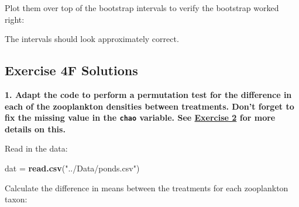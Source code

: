 \documentclass[]{book}
\newenvironment{Shaded}{\begin{snugshade}}{\end{snugshade}}
\newcommand{\DataTypeTok}[1]{\textcolor[rgb]{0.13,0.29,0.53}{#1}}
\newcommand{\KeywordTok}[1]{\textcolor[rgb]{0.13,0.29,0.53}{\textbf{#1}}}
\newcommand{\NormalTok}[1]{#1}
\newcommand{\OperatorTok}[1]{\textcolor[rgb]{0.81,0.36,0.00}{\textbf{#1}}}
\newcommand{\StringTok}[1]{\textcolor[rgb]{0.31,0.60,0.02}{#1}}
\begin{document}
Plot them over top of the bootstrap intervals to verify the bootstrap worked right:

The intervals should look approximately correct.

\hypertarget{ex4f-answers}{%
\subsection*{Exercise 4F Solutions}\label{ex4f-answers}}

\textbf{1. Adapt the code to perform a permutation test for the difference in each of the zooplankton densities between treatments. Don't forget to fix the missing value in the \texttt{chao} variable. See \protect\hyperlink{ex1b}{Exercise 2} for more details on this.}

Read in the data:

\begin{Shaded}
\begin{Highlighting}[]
\NormalTok{dat =}\StringTok{ }\KeywordTok{read.csv}\NormalTok{(}\StringTok{"../Data/ponds.csv"}\NormalTok{)}
\end{Highlighting}
\end{Shaded}

Calculate the difference in means between the treatments for each zooplankton taxon:

\begin{Shaded}
\end{Shaded}
\end{document}
